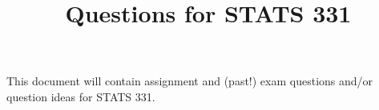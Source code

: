 \documentclass[12pt, a4paper]{article}
\title{Questions for STATS 331}
\begin{document}
This document will contain assignment and (past!) exam questions
and/or question ideas for STATS 331.
\end{document}
